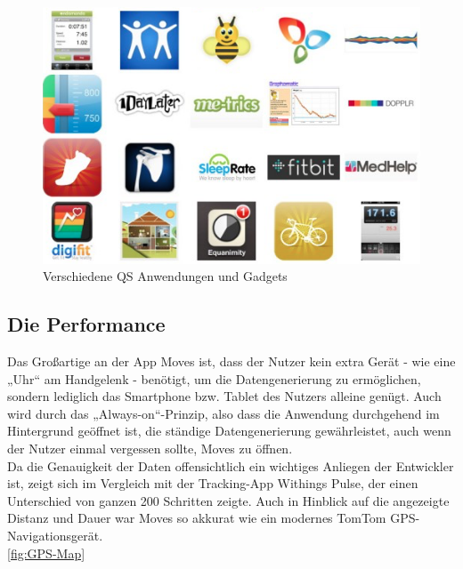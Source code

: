\begin{figure}[h]
\centering
\includegraphics[scale=0.3]{images/qs-anwndungen-gadgets.png}
\caption{Verschiedene QS Anwendungen und Gadgets \cite{fig:Anwendungen}}
\label{fig:Anwendungen}
\end{figure}

\subsection{Die Performance}
\label{ch:Apps:sec:Moves:subsec:PERF}

Das Großartige an der App Moves ist, dass der Nutzer kein extra Gerät - wie eine „Uhr“ am Handgelenk - benötigt, um die Datengenerierung zu ermöglichen, sondern lediglich das Smartphone bzw. Tablet des Nutzers alleine genügt. 
Auch wird durch das „Always-on“-Prinzip, also dass die Anwendung durchgehend im Hintergrund geöffnet ist, die ständige Datengenerierung gewährleistet, auch wenn der Nutzer einmal vergessen sollte, Moves zu öffnen.
\\
Da die Genauigkeit der Daten offensichtlich ein wichtiges Anliegen der Entwickler ist, zeigt sich im Vergleich mit der Tracking-App Withings Pulse, der einen Unterschied von ganzen 200 Schritten zeigte. 
Auch in Hinblick auf die angezeigte Distanz und Dauer war Moves so akkurat wie ein modernes TomTom GPS-Navigationsgerät.
\\
\ref{fig:GPS-Map}

